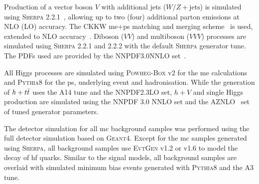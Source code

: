 Production of a vector boson $V$ with additional jets ($W/Z+\mathrm{jets}$) is simulated using \textsc{Sherpa} 2.2.1~\cite{Gleisberg:2008ta,Bothmann:2019yzt}, allowing up to two (four) additional parton emissions at NLO (LO) accuracy. The CKKW \gls{me}+\gls{ps} matching and merging scheme~\cite{Hoeche:2009rj,Catani:2001cc} is used, extended to NLO accuracy~\cite{Hoeche:2012yf}. Diboson ($VV$) and multiboson ($VVV$) processes are simulated using \textsc{Sherpa} 2.2.1 and 2.2.2 with the default \textsc{Sherpa} generator tune. The \glspl{PDF} used are provided by the NNPDF3.0NNLO set~\cite{Ball:2014uwa}.

All Higgs processes are simulated using \textsc{Powheg-Box} v2 for the \gls{me} calculations and \textsc{Pythia8} for the \gls{ps}, underlying event and hadronisation. While the generation of $h+t\bar{t}$ uses the A14 tune and the NNPDF2.3LO set, $h+V$ and single Higgs production are simulated using the NNPDF 3.0 NNLO set and the AZNLO~\cite{ATL-PHYS-PUB-2013-017} set of tuned generator parameters.

The detector simulation for all \gls{mc} background samples was performed using the full detector simulation based on \textsc{Geant4}. Except for the \gls{mc} samples generated using \textsc{Sherpa}, all background samples use \textsc{EvtGen} v1.2 or v1.6 to model the decay of \gls{hf} quarks. Similar to the signal models, all background samples are overlaid with simulated minimum bias events generated with \textsc{Pythia8} and the A3 tune.


